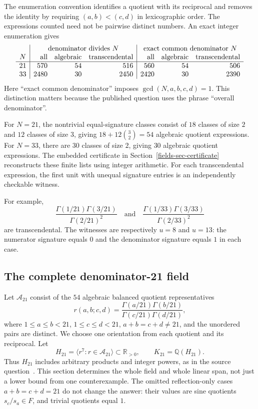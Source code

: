\documentclass[11pt,a4paper]{article}
\theoremstyle{definition}
\theoremstyle{remark}
\numberwithin{equation}{section}
\begin{document}
The enumeration convention identifies a quotient with its reciprocal and
removes the identity by requiring $(a,b)<(c,d)$ in lexicographic order.
The expressions counted need not be pairwise distinct numbers.  An exact
integer enumeration gives
\[
\begin{array}{c|rrr|rrr}
&\multicolumn{3}{c|}{\text{denominator divides }N}
&\multicolumn{3}{c}{\text{exact common denominator }N}\\
N&\text{all}&\text{algebraic}&\text{transcendental}
 &\text{all}&\text{algebraic}&\text{transcendental}\\\hline
21&570&54&516&560&54&506\\
33&2480&30&2450&2420&30&2390
\end{array}
\]
Here ``exact common denominator'' imposes
$\gcd(N,a,b,c,d)=1$.  This distinction matters because the published
question uses the phrase ``overall denominator''.

For $N=21$, the nontrivial equal-signature classes consist of $18$ classes
of size $2$ and $12$ classes of size $3$, giving
$18+12\binom32=54$ algebraic quotient expressions.  For $N=33$, there are
$30$ classes of size $2$, giving $30$ algebraic quotient expressions.
The embedded certificate in Section~\ref{fields-sec-certificate}
reconstructs these finite lists using integer arithmetic. For each
transcendental expression, the first unit with unequal signature entries
is an independently checkable witness.

For example,
\[
 \frac{\Gamma(1/21)\Gamma(3/21)}{\Gamma(2/21)^2}
 \quad\text{and}\quad
 \frac{\Gamma(1/33)\Gamma(3/33)}{\Gamma(2/33)^2}
\]
are transcendental.  The witnesses are respectively $u=8$ and $u=13$:
the numerator signature equals $0$ and the denominator signature equals
$1$ in each case.



\subsection{The complete denominator-21 field}

Let $\mathcal A_{21}$ consist of the $54$ algebraic balanced quotient
representatives
\[
 r(a,b;c,d)=\frac{\Gamma(a/21)\Gamma(b/21)}
 {\Gamma(c/21)\Gamma(d/21)},
\]
where $1\leq a\leq b<21$, $1\leq c\leq d<21$,
$a+b=c+d\ne21$, and the unordered pairs are distinct. We choose one
orientation from each quotient and its reciprocal. Let
\[
 H_{21}=\langle r^7:r\in\mathcal A_{21}\rangle\subset\mathbb R_{>0},
 \qquad K_{21}=\mathbb Q(H_{21}).
\]
Thus $H_{21}$ includes arbitrary products and integer powers, as in the
source question~\cite{fields-MSE}. This section determines the whole field and
whole linear span, not just a lower bound from one counterexample.
The omitted reflection-only cases $a+b=c+d=21$ do not change the
answer: their values are sine quotients $s_c/s_a\in F$, and trivial
quotients equal $1$.
\end{document}
